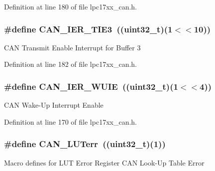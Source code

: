 \-Definition at line 180 of file lpc17xx\-\_\-can.\-h.

\hypertarget{group___c_a_n___private___macros_ga4d555856f1c80fe21c7fbd0858ec2118}{
\subsubsection[{\-C\-A\-N\-\_\-\-I\-E\-R\-\_\-\-T\-I\-E3}]{\setlength{\rightskip}{0pt plus 5cm}\#define {\bf \-C\-A\-N\-\_\-\-I\-E\-R\-\_\-\-T\-I\-E3}~((uint32\-\_\-t)(1$<$$<$10))}}\label{group___c_a_n___private___macros_ga4d555856f1c80fe21c7fbd0858ec2118}
\-C\-A\-N \-Transmit \-Enable \-Interrupt for \-Buffer 3 

\-Definition at line 182 of file lpc17xx\-\_\-can.\-h.

\hypertarget{group___c_a_n___private___macros_gad9eff97f356d550aa52f0545e3c459d2}{
\subsubsection[{\-C\-A\-N\-\_\-\-I\-E\-R\-\_\-\-W\-U\-I\-E}]{\setlength{\rightskip}{0pt plus 5cm}\#define {\bf \-C\-A\-N\-\_\-\-I\-E\-R\-\_\-\-W\-U\-I\-E}~((uint32\-\_\-t)(1$<$$<$4))}}\label{group___c_a_n___private___macros_gad9eff97f356d550aa52f0545e3c459d2}
\-C\-A\-N \-Wake-\/\-Up \-Interrupt \-Enable 

\-Definition at line 170 of file lpc17xx\-\_\-can.\-h.

\hypertarget{group___c_a_n___private___macros_gae868865b95dfd2bf3e5704dfe291f49d}{
\subsubsection[{\-C\-A\-N\-\_\-\-L\-U\-Terr}]{\setlength{\rightskip}{0pt plus 5cm}\#define {\bf \-C\-A\-N\-\_\-\-L\-U\-Terr}~((uint32\-\_\-t)(1))}}\label{group___c_a_n___private___macros_gae868865b95dfd2bf3e5704dfe291f49d}
\-Macro defines for \-L\-U\-T \-Error \-Register \-C\-A\-N \-Look-\/\-Up \-Table \-Error 

